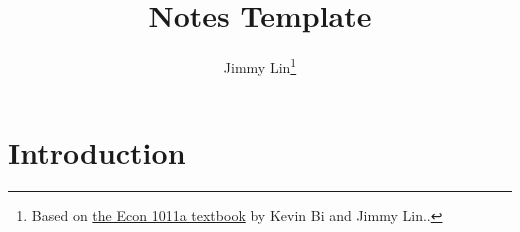 \documentclass[12pt,twoside=false,openright,numbers=noenddot]{scrbook}
\title{Notes Template}
\subtitle{}
\author{Jimmy Lin\footnote{Based on \href{https://github.com/TheKeveloper/ECON-1011A-Textbook/blob/master/textbook.pdf}{the Econ 1011a textbook} by Kevin Bi and Jimmy Lin..}}
\begin{document}
\maketitle
\tableofcontents

\part{Introduction}

\end{document}
